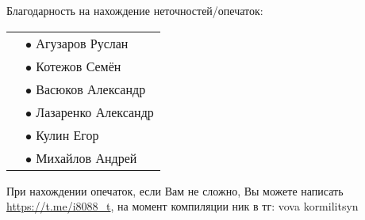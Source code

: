 Благодарность на нахождение неточностей/опечаток:

\begin{tabular}{rl}
    & $\bullet$ Агузаров Руслан \\
    & $\bullet$ Котежов Семён \\
    & $\bullet$ Васюков Александр \\
    & $\bullet$ Лазаренко Александр \\
    & $\bullet$ Кулин Егор \\
    & $\bullet$ Михайлов Андрей \\
\end{tabular}

При нахождении опечаток, если Вам не сложно, Вы можете написать \url{https://t.me/i8088_t}, на момент компиляции ник в тг: vova kormilitsyn
